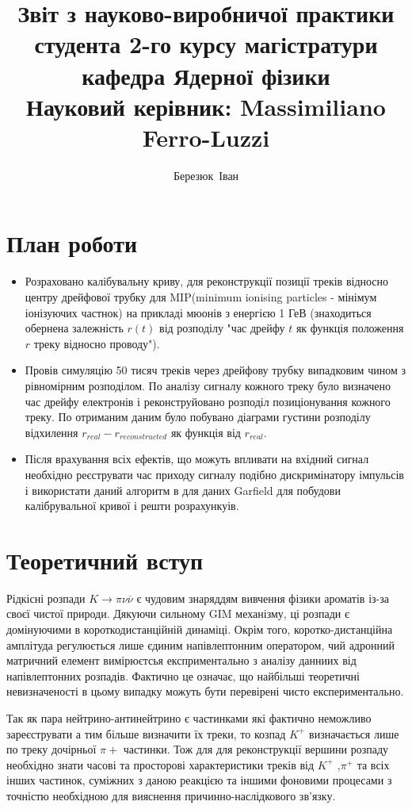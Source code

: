\documentclass[]{article}
\author{Березюк~Іван}
\title{ Звіт з науково-виробничої практики \\ 
		студента 2-го курсу магістратури \\
		кафедра Ядерної фізики\\
		Науковий керівник: Massimiliano Ferro-Luzzi\\ 
		}
\begin{document}
	\maketitle
	\newpage
	\section{ План роботи}
	\begin{itemize}
		\item Розраховано калібувальну криву, для реконструкції позиції треків відносно центру дрейфової трубку для MIP(minimum ionising particles - мінімум іонізуючих частнок) на прикладі мюонів з енергією 1 ГеВ (знаходиться обернена залежність $r(t)$ від розподілу "час дрейфу $t$ як функція положення $r$ треку відносно проводу").\par
		\item Провів симуляцію 50 тисяч треків через дрейфову трубку випадковим чином з рівномірним розподілом. По аналізу сигналу кожного треку було визначено час дрейфу електронів і реконструйовано розподіл позиціонування кожного треку. По отриманим даним було побувано діаграми густини розподілу відхилення $r_{real} - r_{reconstructed}$ як функція від $r_{real}$.
	
		\item Після врахування всіх ефектів, що можуть впливати на вхідний сигнал необхідно реєструвати час приходу сигналу подібно дискримінатору імпульсів і використати даний алгоритм в для даних Garfield для побудови калібрувальної кривої і решти розрахункуів.
	\end{itemize}

	\newpage
	\section{Теоретичний вступ}
		Рідкісні розпади $ K \rightarrow \pi\nu \overline{\nu} $ є чудовим знаряддям вивчення фізики ароматів із-за своєї чистої природи. Дякуючи сильному GIM механізму, ці розпади є домінуючими в короткодистанційній динаміці. Окрім того, коротко-дистанційна амплітуда регулюється лише єдиним напівлептонним оператором, чий адронний матричний елемент вимірюєтсья експриментально з аналізу данниих від напівлептонних розпадів. Фактично це означає, що найбільші теоретичні невизначеності в цьому випадку можуть бути перевірені чисто експериментально.
		
		Так як пара нейтрино-антинейтрино є частинками які фактично неможливо зареєструвати а тим більше визначити їх треки, то козпад $K^+$ визначається лише по треку дочірньої $\pi+$ частинки. Тож для для реконструкції вершини розпаду необхідно знати часові та просторові характеристики треків від $K^+$ ,$\pi^+$ та всіх інших частинок, суміжних з даною реакцією та іншими фоновими процесами з точністю необхідною для вияснення причинно-наслідкового зв’язку.
		
\end{document}
